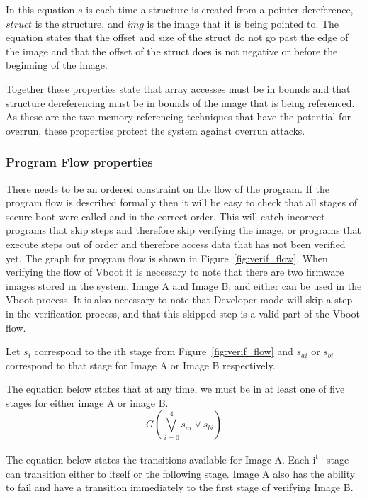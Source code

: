 \documentclass[../report.tex]{subfiles}
\begin{document}
In this equation $s$ is each time a structure is created from a pointer dereference, $struct$ is the structure, and $img$ is the image that it is being pointed to.
The equation states that the offset and size of the struct do not go past the edge of the image and that the offset of the struct does is not negative or before the beginning of the image.

Together these properties state that array accesses must be in bounds and that structure dereferencing must be in bounds of the image that is being referenced.
As these are the two memory referencing techniques that have the potential for overrun, these properties protect the system against overrun attacks.

\subsubsection{Program Flow properties}

There needs to be an ordered constraint on the flow of the program. 
If the program flow is described formally then it will be easy to check that all stages of secure boot were called and in the correct order.
This will catch incorrect programs that skip steps and therefore skip verifying the image, or programs that execute steps out of order and therefore access data that has not been verified yet.
The graph for program flow is shown in Figure~\ref{fig:verif_flow}.
When verifying the flow of Vboot it is necessary to note that there are two firmware images stored in the system, Image A and Image B, and either can be used in the Vboot process. 
It is also necessary to note that Developer mode will skip a step in the verification process, and that this skipped step is a valid part of the Vboot flow.

Let $s_i$ correspond to the ith stage from Figure~\ref{fig:verif_flow} and $s_{ai}$ or $s_{bi}$ correspond to that stage for Image A or Image B respectively.

The equation below states that at any time, we must be in at least one of five stages for either image A or image B.
\begin{equation}
    G(\bigvee\limits_{i = 0}^{4} s_{ai} \lor s_{bi})
\end{equation}

The equation below states the transitions available for Image A.
Each i\textsuperscript{th} stage can transition either to itself or the following stage.
Image A also has the ability to fail and have a transition immediately to the first stage of verifying Image B.
\end{document}
